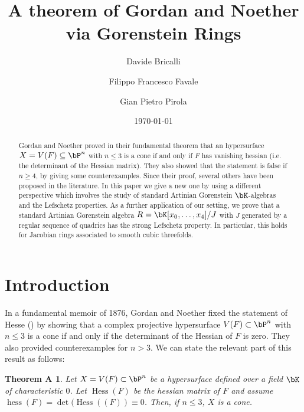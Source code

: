 \documentclass[a4paper,11pt]{amsart}
\title[A theorem of Gordan and Noether via Gorenstein Rings]{A theorem of Gordan and Noether via Gorenstein Rings}
\author{Davide Bricalli}
\author{Filippo Francesco Favale}
\author{Gian Pietro Pirola}
\date{\today}
\newtheorem*{thA}{Theorem A}
\DeclareMathOperator{\Hess}{Hess}
\DeclareMathOperator{\hess}{hess}
\begin{document}
\maketitle




\begin{abstract}
Gordan and Noether proved in their fundamental theorem that an hypersurface $X=V(F)\subseteq \bP^n$ with $n\leq 3$ is a cone if and only if $F$ has vanishing hessian (i.e. the determinant of the Hessian matrix). They also showed that the statement is false if $n\geq 4$, by giving some counterexamples. 
Since their proof, several others have been proposed in the literature. In this paper we give a new one by using a different perspective which involves the study of standard Artinian Gorenstein $\bK$-algebras and the Lefschetz properties. As a further application of our setting, we prove that a standard Artinian Gorenstein algebra $R=\bK[x_0,\dots,x_4]/J$ with $J$ generated by a regular sequence of quadrics has the strong Lefschetz property. In particular, this holds for Jacobian rings associated to smooth cubic threefolds.
\end{abstract}


\section*{Introduction}
In a fundamental memoir of 1876, Gordan and Noether \cite{GN} fixed the statement of Hesse ({\cites{Hes51,Hes59}}) by showing that a complex projective hypersurface $V(F)\subset \bP^n$ with $n\leq 3$ is a cone if and only if the determinant of the Hessian of $F$ is zero. 
They also provided counterexamples for $n>3$. We can state the relevant part of this result as follows:

\begin{thA} 
Let $X=V(F)\subset \bP^n$ be a hypersurface defined over a field $\bK$ of characteristic $0$. 
Let $\Hess(F)$ be the hessian matrix of $F$ and assume $\hess(F)=\det(\Hess((F))\equiv 0$. 
Then, if $n\leq 3$, $X$ is a cone.
\end{thA}
\end{document}
